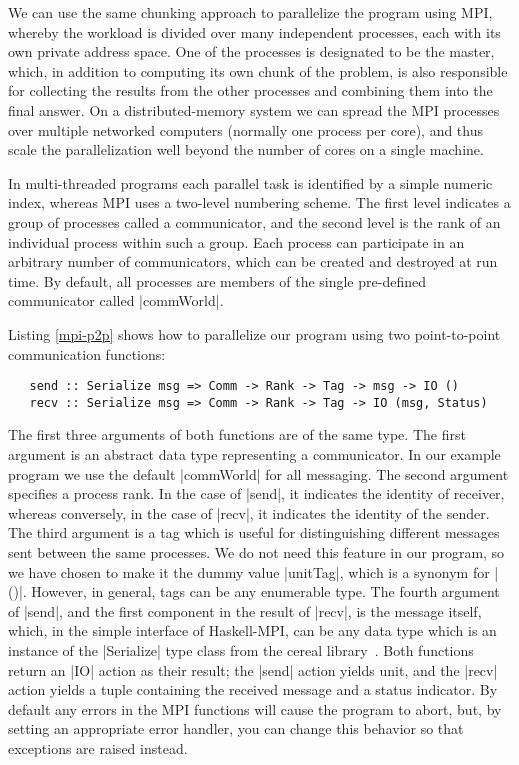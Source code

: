 \documentclass{tmr}
\begin{document}
We can use the same chunking approach to parallelize the program
using MPI, whereby the workload is divided over many
independent processes, each with its own private address space.
One of the processes is designated to be the master,
which, in addition to computing its own chunk of the problem, is also responsible for
collecting the results from the other processes and combining them into the final answer.
On a distributed-memory system we can spread the MPI processes over
multiple networked computers (normally one process per core), and thus
scale the parallelization well beyond the number of cores on a single machine.

In multi-threaded programs each parallel task is identified by a simple
numeric index, whereas
MPI uses a two-level numbering scheme.
The first level indicates a group of processes called a communicator,
and the second level is the rank of an individual process within such a group.
Each process can participate in an arbitrary number of communicators,
which can be created and destroyed at run time. By default, all
processes are members of the single pre-defined communicator
called |commWorld|.

Listing \ref{mpi-p2p} shows how to parallelize our program using
two point-to-point communication functions:
\begin{Verbatim}
   send :: Serialize msg => Comm -> Rank -> Tag -> msg -> IO ()
   recv :: Serialize msg => Comm -> Rank -> Tag -> IO (msg, Status)
\end{Verbatim}
The first three arguments of both functions are of the same type.
The first argument is an abstract data
type representing a communicator. In our example program we use
the default |commWorld| for all messaging. The second argument
specifies a process rank. In the case of |send|, it indicates
the identity of receiver, whereas conversely, in the case
of |recv|, it indicates the identity of the sender.
The third argument is a tag which is useful for distinguishing
different messages sent between the same processes.
We do not need this feature in our program, so we have chosen
to make it the dummy value |unitTag|, which is a synonym for |()|.
However, in general, tags can be any enumerable type.
The fourth argument of |send|, and the first component in
the result of |recv|, is the message itself, which,
in the simple interface of Haskell-MPI, can be any
data type which is an instance of the |Serialize| type class
from the cereal library~\cite{cereal}. Both functions return
an |IO| action as their result; the |send| action yields
unit, and the |recv| action yields a tuple containing
the received message and a status indicator.
By default any errors in
the MPI functions will cause the program to abort, but, by
setting an appropriate error handler, you can
change this behavior so that exceptions are raised instead.
\end{document}
